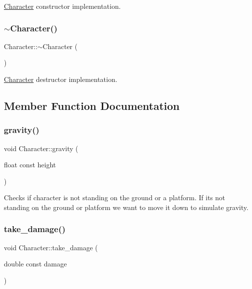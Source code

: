 \hyperlink{classCharacter}{Character} constructor implementation. \mbox{\label{classCharacter_a9e9be564d05ded80962b2045aa70b3fc}} 
\subsubsection{\texorpdfstring{$\sim$\+Character()}{~Character()}}
{\footnotesize\ttfamily Character\+::$\sim$\+Character (\begin{DoxyParamCaption}{ }\end{DoxyParamCaption})}

\hyperlink{classCharacter}{Character} destructor implementation. 

\subsection{Member Function Documentation}
\mbox{\label{classCharacter_a34b7cd24b7f3ce54f2f99cf9b059a05d}} 
\subsubsection{\texorpdfstring{gravity()}{gravity()}}
{\footnotesize\ttfamily void Character\+::gravity (\begin{DoxyParamCaption}\item[{float const}]{height }\end{DoxyParamCaption})}

Checks if character is not standing on the ground or a platform. If it\textquotesingle{}s not standing on the ground or platform we want to move it down to simulate gravity. \mbox{\label{classCharacter_acb5c904503c7e446ac508261946c530e}} 
\subsubsection{\texorpdfstring{take\+\_\+damage()}{take\_damage()}}
{\footnotesize\ttfamily void Character\+::take\+\_\+damage (\begin{DoxyParamCaption}\item[{double const}]{damage }\end{DoxyParamCaption})}

